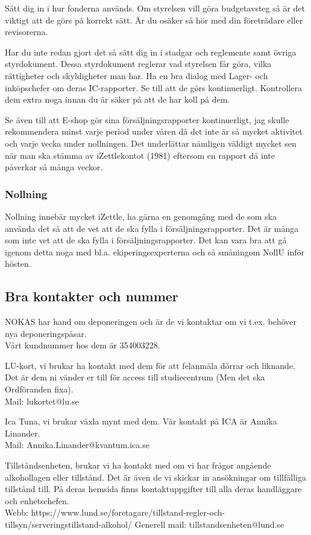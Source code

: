 \documentclass[10pt]{article}
\begin{document}
Sätt dig in i hur fonderna används. Om styrelsen vill göra budgetavsteg så är det viktigt att de görs på korrekt sätt. Är du osäker så hör med din företrädare eller revisorerna.

Har du inte redan gjort det så sätt dig in i stadgar och reglemente samt övriga styrdokument. Dessa styrdokument reglerar vad styrelsen får göra, vilka rättigheter och skyldigheter man har.
Ha en bra dialog med Lager- och inköpschefer om deras IC-rapporter. Se till att de görs kontinuerligt. Kontrollera dem extra noga innan du är säker på att de har koll på dem.

Se även till att E-shop gör sina försäljningsrapporter kontinuerligt, jag skulle rekommendera minst varje period under våren då det inte är så mycket aktivitet och varje vecka under nollningen. Det underlättar nämligen väldigt mycket sen när man ska stämma av iZettlekontot (1981) eftersom en rapport då inte påverkar så många veckor.

\subsubsection{Nollning}
Nollning innebär mycket iZettle, ha gärna en genomgång med de som ska använda det så att de vet att de ska fylla i försäljningsrapporter.
Det är många som inte vet att de ska fylla i försäljningsrapporter. Det kan vara bra att gå igenom detta noga med bl.a. ekiperingsexperterna och så småningom NollU inför hösten.

\subsection{Bra kontakter och nummer}
NOKAS har hand om deponeringen och är de vi kontaktar om vi t.ex. behöver nya deponeringspåsar. \\Vårt kundnummer hos dem är 354003228.

LU-kort, vi brukar ha kontakt med dem för att felanmäla dörrar och liknande. Det är dem ni vänder er till för access till studiecentrum (Men det ska Ordföranden fixa).
\\Mail: lukortet@lu.se

Ica Tuna, vi brukar växla mynt med dem.
Vår kontakt på ICA är Annika Linander.
\\Mail: Annika.Linander@kvantum.ica.se

Tillståndsenheten, brukar vi ha kontakt med om vi har frågor angående alkohollagen eller tillstånd. Det är även de vi skickar in ansökningar om tillfälliga tillstånd till. På deras hemsida finns kontaktuppgifter till alla deras handläggare och enhetschefen.
\\Webb: https://www.lund.se/foretagare/tillstand-regler-och-tillsyn/serveringstillstand-alkohol/
Generell mail: tillstandsenheten@lund.se
\end{document}
